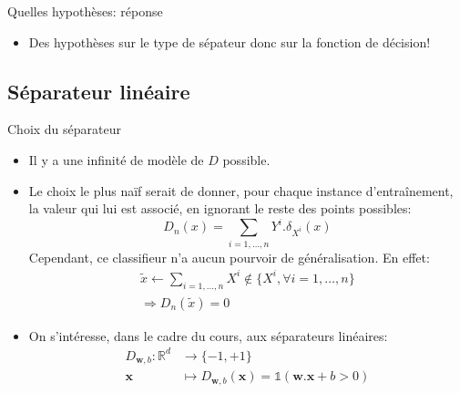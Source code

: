 \documentclass[8pt]{beamer}
\begin{document}
		\begin{frame}{Quelles hypothèses: réponse}
			\begin{itemize}
				\item<2-> Des hypothèses sur le type de sépateur donc sur la fonction de décision!
			\end{itemize}
		\end{frame}

	\subsection[linear]{Séparateur linéaire}

	\begin{frame}{Choix du séparateur}
		\begin{itemize}
			\item  Il y a une infinité de modèle de $D$ possible.
			\item  Le choix le plus naïf serait de donner, pour chaque instance d'entraînement, la valeur qui lui est associé, en ignorant le reste des points possibles:
			\begin{equation*}
				D_n(x) = \sum_{i=1,\dots,n} Y^i . \delta_{X^i}(x)
			\end{equation*}
			Cependant, ce classifieur n'a aucun pourvoir de généralisation. En effet:
			\begin{gather*}
				\widetilde{x} \leftarrow \sum_{i=1,\dots,n} X^i \notin \{X^i, \forall i=1,\dots,n\} \\
				\Rightarrow D_n(\widetilde{x}) = 0
			\end{gather*}
			\item  On s'intéresse, dans le cadre du cours, aux séparateurs linéaires:
			\begin{align*}
				D_{\textbf{w}, b}: \mathbb{R}^d &\rightarrow \{-1, +1\} \\
				\textbf{x} &\mapsto D_{\textbf{w}, b}(\textbf{x}) = \mathbb{1}(\textbf{w}.\textbf{x} + b > 0)
			\end{align*}
		\end{itemize}
	\end{frame}
\end{document}
